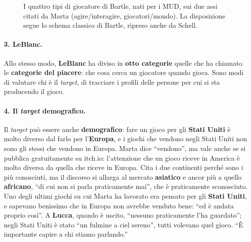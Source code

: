 \begin{figure}[htbp]
\centering
{}
\caption{I quattro tipi di giocatore di Bartle, nati per i MUD, sui due assi citati da
Marta (agire/interagire, giocatori/mondo). La disposizione segue lo schema classico di
Bartle, ripreso anche da Schell.}
\label{a13:fig:bartle}
\end{figure}

\paragraph{3. LeBlanc.} Allo stesso modo, \textbf{LeBlanc} ha diviso in \textbf{otto
categorie} quelle che ha chiamato le \textbf{categorie del piacere}: che cosa cerca un
giocatore quando gioca. Sono modi di valutare chi è il \emph{target}, di tracciare i profili
delle persone per cui si sta producendo il gioco.

\paragraph{4. Il \emph{target} demografico.} Il \emph{target} può essere anche
\textbf{demografico}: fare un gioco per gli \textbf{Stati Uniti} è molto diverso dal farlo per
l'\textbf{Europa}, e i giochi che vendono negli Stati Uniti non sono gli stessi che vendono in
Europa. Marta dice ``vendono'', ma vale anche se si pubblica gratuitamente su itch.io:
l'attenzione che un gioco riceve in America è molto diversa da quella che riceve in Europa.
Cita i due continenti perché sono i più conosciuti, ma il discorso si allarga al mercato
\textbf{asiatico} e ancor più a quello \textbf{africano}, ``di cui non si parla praticamente
mai'', che è praticamente sconosciuto. Uno degli ultimi giochi su cui Marta ha lavorato era
pensato per gli \textbf{Stati Uniti}, e sapevano benissimo che in Europa non avrebbe venduto
bene: ``ed è andata proprio così''. A \textbf{Lucca}, quando è uscito, ``nessuno praticamente
l'ha guardato''; negli Stati Uniti è stato ``un fulmine a ciel sereno'', tutti volevano quel
gioco. ``È importante capire a chi stiamo parlando.''

